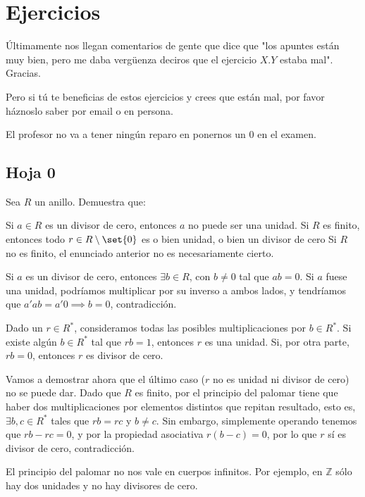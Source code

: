 \chapter{Ejercicios}

Últimamente nos llegan comentarios de gente que dice que "los apuntes están muy bien, pero me daba vergüenza deciros que el ejercicio $X.Y$ estaba mal". Gracias.

Pero si tú te beneficias de estos ejercicios y crees que están mal, por favor háznoslo saber por email o en persona.

El profesor no va a tener ningún reparo en ponernos un 0 en el examen.

\setcounter{section}{-1} %
\section{Hoja 0}

\begin{problem}
Sea $R$ un anillo. Demuestra que:

\ppart Si $a \in R$ es un divisor de cero, entonces $a$ no puede ser una unidad.
\ppart Si $R$ es finito, entonces todo $r \in R \setminus \set{0}$ es o bien unidad, o bien un divisor de cero
\ppart Si $R$ no es finito, el enunciado anterior no es necesariamente cierto.
\solution


\spart

Si $a$ es un divisor de cero, entonces $∃b ∈ R$, con $b ≠ 0$ tal que $ab = 0$. Si $a$ fuese una unidad, podríamos multiplicar por su inverso a ambos lados, y tendríamos que $a'ab = a' 0 \implies b = 0$, contradicción.

\spart

Dado un $r ∈ R^*$, consideramos todas las posibles multiplicaciones por $b ∈ R^*$. Si existe algún $b ∈ R^*$ tal que $rb = 1$, entonces $r$ es una unidad. Si, por otra parte, $rb = 0$, entonces $r$ es divisor de cero.

Vamos a demostrar ahora que el último caso ($r$ no es unidad ni divisor de cero) no se puede dar. Dado que $R$ es finito, por el principio del palomar tiene que haber dos multiplicaciones por elementos distintos que repitan resultado, esto es, $∃b,c ∈ R^*$ tales que $rb = rc$ y $b ≠ c$. Sin embargo, simplemente operando tenemos que $rb - rc = 0$, y por la propiedad asociativa $r(b-c) = 0$, por lo que $r$ sí es divisor de cero, contradicción.

\spart

El principio del palomar no nos vale en cuerpos infinitos. Por ejemplo, en $ℤ$ sólo hay dos unidades y no hay divisores de cero.
\end{problem}

